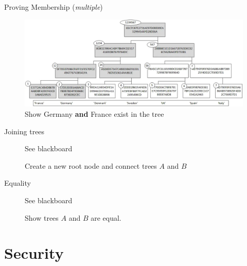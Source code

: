 \documentclass{beamer}
\begin{document}
\begin{frame}{Proving Membership (\textit{multiple})}
	
	\begin{figure}
		\includegraphics[width=.8\textwidth]{../Images/merkle-example.png}
		\caption{Show Germany \textbf{and} France exist in the tree \cite{buchannen_2022}}
		
	\end{figure}
\end{frame}


\begin{frame}{Joining trees}

\begin{figure}
	See blackboard
	\caption{ Create a new root node and connect trees $A$ and $B$  \cite{boneh2020graduate}}
\end{figure}
\end{frame}


\begin{frame}{Equality}
	
	\begin{figure}
		See blackboard
		\caption{Show trees $A$ and $B$ are equal.}
	\end{figure}
\end{frame}



\section{Security}
\end{document}
